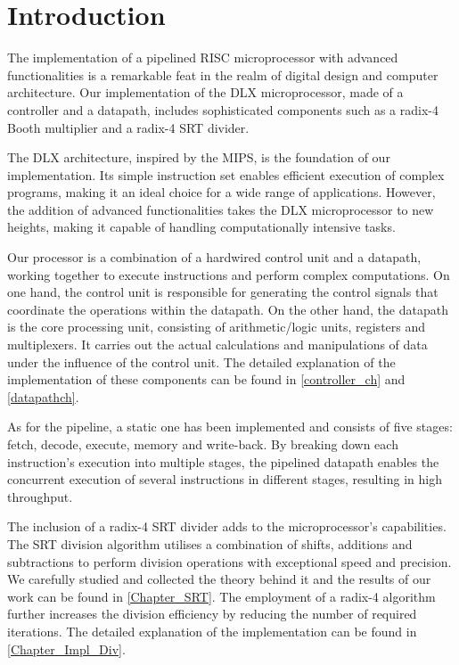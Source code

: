 \chapter{Introduction}\label{Introduction}

The implementation of a pipelined RISC microprocessor with advanced functionalities is a remarkable feat in the realm of digital design and computer architecture. 
Our implementation of the DLX microprocessor, made of a controller and a datapath, includes sophisticated components such as a radix-4 Booth multiplier and a radix-4 SRT divider.

The DLX architecture, inspired by the MIPS, is the foundation of our implementation. 
Its simple instruction set enables efficient execution of complex programs, making it an ideal choice for a wide range of applications. 
However, the addition of advanced functionalities takes the DLX microprocessor to new heights, making it capable of handling computationally intensive tasks. 

Our processor is a combination of a hardwired control unit and a datapath, working together to execute instructions and perform complex computations. 
On one hand, the control unit is responsible for generating the control signals that coordinate the operations within the datapath. 
On the other hand, the datapath is the core processing unit, consisting of arithmetic/logic units, registers and multiplexers. 
It carries out the actual calculations and manipulations of data under the influence of the control unit. 
The detailed explanation of the implementation of these components can be found in \autoref{controller_ch} and \autoref{datapathch}.

As for the pipeline, a static one has been implemented and consists of five stages: fetch, decode, execute, memory and write-back. 
By breaking down each instruction's execution into multiple stages, the pipelined datapath enables the concurrent execution of several instructions in different stages, resulting in high throughput.

The inclusion of a radix-4 SRT divider adds to the microprocessor's capabilities. 
The SRT division algorithm utilises a combination of shifts, additions and subtractions to perform division operations with exceptional speed and precision. 
We carefully studied and collected the theory behind it and the results of our work can be found in  \autoref{Chapter_SRT}.
The employment of a radix-4 algorithm further increases the division efficiency by reducing the number of required iterations.
The detailed explanation of the implementation can be found in \autoref{Chapter_Impl_Div}.

